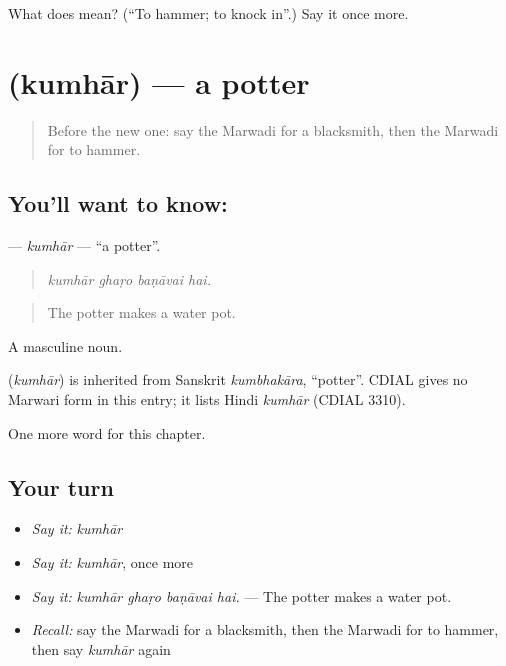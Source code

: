 \begin{tcolorbox}[breakable,colback=teal!4,colframe=teal!35!black,title={Before you move on}]
What does  mean? (\textquotedblleft{}To hammer; to knock in\textquotedblright{}.) Say it once more.
\end{tcolorbox}
\section[\texorpdfstring{\mw{कुम्हार} (kumhār)}{कुम्हार (kumhār)}]{ (kumhār) — a potter}

\label{lesson:MW-C264-kumhar}



\begin{quote}
Before the new one: say the Marwadi for a blacksmith, then the Marwadi for to hammer.
\end{quote}

\subsection*{You'll want to know: }
\textbf{} — \emph{kumhār} — \textquotedblleft{}a potter\textquotedblright{}.

\begin{quote}
   
\end{quote}

\begin{quote}
\emph{kumhār ghaṛo baṇāvai hai.}
\end{quote}

\begin{quote}
The potter makes a water pot.
\end{quote}

A masculine noun.

\begin{cousinweb}
\textbf{} (\emph{kumhār}) is inherited from Sanskrit \emph{kumbhakāra}, \textquotedblleft{}potter\textquotedblright{}. CDIAL gives no Marwari form in this entry; it lists Hindi \emph{kumhār} (CDIAL 3310).
\end{cousinweb}

\begin{grammarlens}[title={What you've built}]
One more word for this chapter.
\end{grammarlens}

\subsection*{Your turn}
\begin{itemize}
\raggedright
  \item \emph{Say it:} \emph{kumhār}
  \item \emph{Say it:} \emph{kumhār}, once more
  \item \emph{Say it:} \emph{kumhār ghaṛo baṇāvai hai.} — The potter makes a water pot.
  \item \emph{Recall:} say the Marwadi for a blacksmith, then the Marwadi for to hammer, then say \emph{kumhār} again
\end{itemize}

